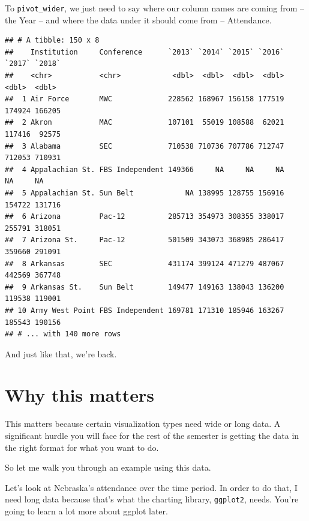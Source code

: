 \documentclass[]{book}
\newenvironment{Shaded}{\begin{snugshade}}{\end{snugshade}}
\newcommand{\DataTypeTok}[1]{\textcolor[rgb]{0.13,0.29,0.53}{#1}}
\newcommand{\KeywordTok}[1]{\textcolor[rgb]{0.13,0.29,0.53}{\textbf{#1}}}
\newcommand{\NormalTok}[1]{#1}
\newcommand{\OperatorTok}[1]{\textcolor[rgb]{0.81,0.36,0.00}{\textbf{#1}}}
\newcommand{\StringTok}[1]{\textcolor[rgb]{0.31,0.60,0.02}{#1}}
\begin{document}
To \texttt{pivot\_wider}, we just need to say where our column names are coming from -- the Year -- and where the data under it should come from -- Attendance.

\begin{Shaded}
\end{Shaded}

\begin{verbatim}
## # A tibble: 150 x 8
##    Institution     Conference      `2013` `2014` `2015` `2016` `2017` `2018`
##    <chr>           <chr>            <dbl>  <dbl>  <dbl>  <dbl>  <dbl>  <dbl>
##  1 Air Force       MWC             228562 168967 156158 177519 174924 166205
##  2 Akron           MAC             107101  55019 108588  62021 117416  92575
##  3 Alabama         SEC             710538 710736 707786 712747 712053 710931
##  4 Appalachian St. FBS Independent 149366     NA     NA     NA     NA     NA
##  5 Appalachian St. Sun Belt            NA 138995 128755 156916 154722 131716
##  6 Arizona         Pac-12          285713 354973 308355 338017 255791 318051
##  7 Arizona St.     Pac-12          501509 343073 368985 286417 359660 291091
##  8 Arkansas        SEC             431174 399124 471279 487067 442569 367748
##  9 Arkansas St.    Sun Belt        149477 149163 138043 136200 119538 119001
## 10 Army West Point FBS Independent 169781 171310 185946 163267 185543 190156
## # ... with 140 more rows
\end{verbatim}

And just like that, we're back.

\hypertarget{why-this-matters}{%
\section{Why this matters}\label{why-this-matters}}

This matters because certain visualization types need wide or long data. A significant hurdle you will face for the rest of the semester is getting the data in the right format for what you want to do.

So let me walk you through an example using this data.

Let's look at Nebraska's attendance over the time period. In order to do that, I need long data because that's what the charting library, \texttt{ggplot2}, needs. You're going to learn a lot more about ggplot later.
\end{document}
